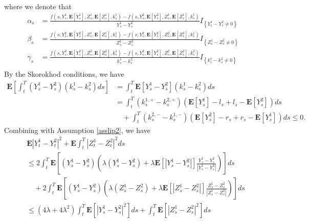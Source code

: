 \documentclass[10pt]{article}%
\numberwithin{equation}{section}
\def \E{\mathbf{E}}
\begin{document}
    where we denote that 
    \begin{equation*}
     \begin{split}
         \alpha_s&=\frac{f(s,Y_s^1,\mathbf{E}[Y_s^1],Z_s^1,\mathbf{E}[Z_s^1],k_s^1)-f(s,Y_s^2,\mathbf{E}[Y_s^2],Z_s^1,\mathbf{E}[Z_s^1],k_s^1)}{Y_s^1-Y_s^2}I_{\left\{Y_s^1-Y_s^2\ne 0\right\}} \\
         \beta_s&=\frac{f(s,Y_s^2,\mathbf{E}[Y_s^2],Z_s^1,\mathbf{E}[Z_s^1],k_s^1)-f(s,Y_s^2,\mathbf{E}[Y_s^2],Z_s^2,\mathbf{E}[Z_s^2],k_s^1)}{Z_s^1-Z_s^2}I_{\left\{Z_s^1-Z_s^2\ne 0\right\}} \\
         \gamma_s&=\frac{f(s,Y_s^2,\mathbf{E}[Y_s^2],Z_s^2,\mathbf{E}[Z_s^2],k_s^1)-f(s,Y_s^2,\mathbf{E}[Y_s^2],Z_s^2,\mathbf{E}[Z_s^2],k_s^2)}{k_s^1-k_s^2}I_{\left\{k_s^1-k_s^2\ne 0\right\}} \\
         \end{split}   
    \end{equation*}
    By the Skorokhod conditions, we have
  \begin{equation*}
      \begin{split}
          \E\left[\int_t^T(Y^1_s-Y^2_s)(k^1_s-k^2_s) ds\right]
          &=\int_t^T\E\left[Y^1_s-Y^2_s\right](k^1_s-k^2_s)ds\\
          &=\int_{t}^{T}(k_s^{1,+}-k_s^{2,+})(\mathbf{E}[Y^1_s]-l_s+l_s-\mathbf{E}[Y^2_s])ds \\
           &\quad+\int_{t}^{T}(k_s^{2,-}-k_s^{1,-})(\mathbf{E}[Y^2_s]-r_s+r_s-\mathbf{E}[Y^1_s])ds \leq 0.
      \end{split}
  \end{equation*}
       Combining with Assumption \ref{asslip2}, we have 
\begin{equation}
    \begin{split}
      & \mathbf{E}\left|Y_t^1-Y_t^2\right|^2+\mathbf{E}\int_{t}^{T}\left|Z_t^1-Z_t^2\right|^2ds\\
      &\leq 2\int_{t}^{T} \mathbf{E}[(Y^1_s-Y^2_s)(\lambda(Y^1_s-Y^2_s)+\lambda\mathbf{E}[\left|Y_s^1-Y_s^2\right|]\frac{Y_s^1-Y_s^2}{\left|Y_s^1-Y_s^2\right|})]ds\\
      &\quad +2 \int_{t}^{T}\mathbf{E}[(Y^1_s-Y^2_s)(\lambda(Z^1_s-Z^2_s)+\lambda\mathbf{E}[\left|Z_s^1-Z_s^2\right|]\frac{Z_s^1-Z_s^2}{\left|Z_s^1-Z_s^2\right|})]ds\\
      &\leq (4\lambda+4\lambda^2) \int_{t}^{T} \mathbf{E}[\left|Y_s^1-Y_s^2\right|^2]ds+\int_{t}^{T} \mathbf{E}[\left|Z_s^1-Z_s^2\right|^2]ds
    \end{split}
\end{equation} 
\end{document}
